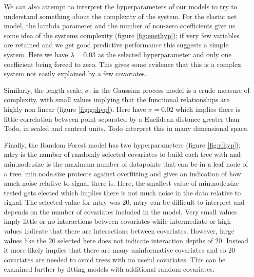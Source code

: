 \documentclass[10pt,]{article}
\begin{document}


We can also attempt to interpret the hyperparameters of our models to try to understand something about the complexity of the system.
For the elastic net model, the lambda parameter and the number of non-zero coefficients give us some idea of the systems complexity (figure \ref{fig:enethyp}); if very few variables are retained and we get good predictive performance this suggests a simple system.
Here we have \(\lambda = 0.03\) as the selected hyperparameter and only one coefficient being forced to zero.
This gives some evidence that this is a complex system not easily explained by a few covariates.

Similarly, the length scale, \(\sigma\), in the Gaussian process model is a crude measure of complexity, with small values implying that the functional relationships are highly non linear (figure \ref{fig:gphyp}).
Here have \(\sigma = 0.02\) which implies there is little correlation between point separated by a Euclidean distance greater than Todo, in scaled and centred units.
Todo interpret this in many dimensional space.

Finally, the Random Forest model has two hyperparameters (figure \ref{fig:rfhyp}); mtry is the number of randomly selected covariates to build each tree with and min.node.size is the maximum number of datapoints that can be in a leaf node of a tree.
min.node.size protects against overfitting and gives an indication of how much noise relative to signal there is.
Here, the smallest value of min.node.size tested gets elected which implies there is not much noise in the data relative to signal.
The selected value for mtry was 20.
mtry can be difficult to interpret and depends on the number of covariates included in the model.
Very small values imply little or no interactions between covariates while intermediate or high values indicate that there are interactions between covariates.
However, large values like the 20 selected here does not indicate interaction depths of 20.
Instead it more likely implies that there are many uninformative covariates and so 20 covariates are needed to avoid trees with no useful covariates.
This can be examined further by fitting models with additional random covariates.
\end{document}
